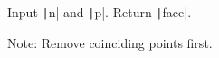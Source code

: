 Input \texttt|n| and \texttt|p|. Return \texttt|face|.

Note: Remove coinciding points first.

\inputminted{cpp}{src/geometry/3d-geometry/3d-convex-hull.cpp.com}
